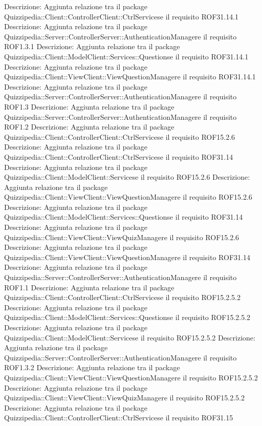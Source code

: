 Descrizione: Aggiunta relazione tra il package Quizzipedia::Client::ControllerClient::CtrlServicese il requisito ROF31.14.1 
Descrizione: Aggiunta relazione tra il package Quizzipedia::Server::ControllerServer::AuthenticationManagere il requisito ROF1.3.1 
Descrizione: Aggiunta relazione tra il package Quizzipedia::Client::ModelClient::Services::Questionse il requisito ROF31.14.1 
Descrizione: Aggiunta relazione tra il package Quizzipedia::Client::ViewClient::ViewQuestionManagere il requisito ROF31.14.1 
Descrizione: Aggiunta relazione tra il package Quizzipedia::Server::ControllerServer::AuthenticationManagere il requisito ROF1.3 
Descrizione: Aggiunta relazione tra il package Quizzipedia::Server::ControllerServer::AuthenticationManagere il requisito ROF1.2 
Descrizione: Aggiunta relazione tra il package Quizzipedia::Client::ControllerClient::CtrlServicese il requisito ROF15.2.6 
Descrizione: Aggiunta relazione tra il package Quizzipedia::Client::ControllerClient::CtrlServicese il requisito ROF31.14 
Descrizione: Aggiunta relazione tra il package Quizzipedia::Client::ModelClient::Servicese il requisito ROF15.2.6 
Descrizione: Aggiunta relazione tra il package Quizzipedia::Client::ViewClient::ViewQuestionManagere il requisito ROF15.2.6 
Descrizione: Aggiunta relazione tra il package Quizzipedia::Client::ModelClient::Services::Questionse il requisito ROF31.14 
Descrizione: Aggiunta relazione tra il package Quizzipedia::Client::ViewClient::ViewQuizManagere il requisito ROF15.2.6 
Descrizione: Aggiunta relazione tra il package Quizzipedia::Client::ViewClient::ViewQuestionManagere il requisito ROF31.14 
Descrizione: Aggiunta relazione tra il package Quizzipedia::Server::ControllerServer::AuthenticationManagere il requisito ROF1.1 
Descrizione: Aggiunta relazione tra il package Quizzipedia::Client::ControllerClient::CtrlServicese il requisito ROF15.2.5.2 
Descrizione: Aggiunta relazione tra il package Quizzipedia::Client::ModelClient::Services::Questionse il requisito ROF15.2.5.2 
Descrizione: Aggiunta relazione tra il package Quizzipedia::Client::ModelClient::Servicese il requisito ROF15.2.5.2 
Descrizione: Aggiunta relazione tra il package Quizzipedia::Server::ControllerServer::AuthenticationManagere il requisito ROF1.3.2 
Descrizione: Aggiunta relazione tra il package Quizzipedia::Client::ViewClient::ViewQuestionManagere il requisito ROF15.2.5.2 
Descrizione: Aggiunta relazione tra il package Quizzipedia::Client::ViewClient::ViewQuizManagere il requisito ROF15.2.5.2 
Descrizione: Aggiunta relazione tra il package Quizzipedia::Client::ControllerClient::CtrlServicese il requisito ROF31.15 
